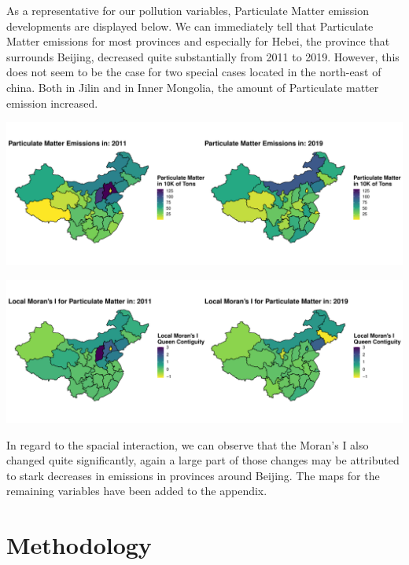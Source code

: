 \documentclass[
]{article}
\begin{document}
	As a representative for our pollution variables, Particulate Matter emission developments are displayed below. We can immediately tell that Particulate Matter emissions for most provinces and especially for Hebei, the province that surrounds Beijing, decreased quite substantially from 2011 to 2019. However, this does not seem to be the case for two special cases located in the north-east of china. Both in Jilin and in Inner Mongolia, the amount of Particulate matter emission increased.
	\begin{center}
		\includegraphics[width = 440pt]{Waste_Gas_Emissions_Particular_Matter_comp.pdf} 
	\end{center}
	\begin{center}
		\includegraphics[width = 440pt]{Ii_Waste_Gas_Emissions_Particular_Matter_comp.pdf} 
	\end{center}
	In regard to the spacial interaction, we can observe that the Moran's I also changed quite significantly, again a large part of those changes may be attributed to stark decreases in emissions in provinces around Beijing. The maps for the remaining variables have been added to the appendix.

	\section{Methodology} \label{Methodology}
	
\end{document}
